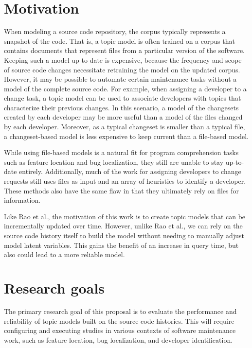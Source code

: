 \section{Motivation}\label{motivation}

When modeling a source code repository, the corpus typically represents
a snapshot of the code. That is, a topic model is often trained on a
corpus that contains documents that represent files from a particular
version of the software. Keeping such a model up-to-date is expensive,
because the frequency and scope of source code changes necessitate
retraining the model on the updated corpus. However, it may be possible
to automate certain maintenance tasks without a model of the complete
source code. For example, when assigning a developer to a change task, a
topic model can be used to associate developers with topics that
characterize their previous changes. In this scenario, a model of the
changesets created by each developer may be more useful than a model of
the files changed by each developer. Moreover, as a typical changeset is
smaller than a typical file, a changeset-based model is less expensive
to keep current than a file-based model.

While using file-based models is a natural fit for program comprehension
tasks such as feature location and bug localization, they still are
unable to stay up-to-date entirely. Additionally, much of the work for
assigning developers to change requests still uses files as input and an
array of heuristics to identify a
developer\needcite. These methods also have the
same flaw in that they ultimately rely on files for information.

Like Rao et al., the motivation of this work is to
create topic models that can be incrementally updated over time.
However, unlike Rao et al., we can rely on the source code history
itself to build the model without needing to manually adjust model
latent variables. This gains the benefit of an increase in query time,
but also could lead to a more reliable model.

\section{Research goals}\label{research-goals}

The primary research goal of this proposal is to evaluate the
performance and reliability of topic models built on the source code
histories. This will require configuring and executing studies in
various contexts of software maintenance work, such as feature location,
bug localization, and developer identification.

